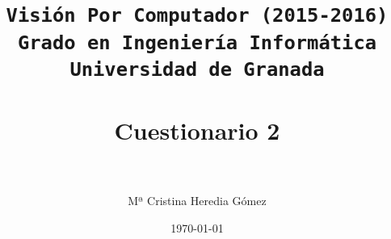 


\title{
\normalfont \normalsize
\texttt{{\bf Visión Por Computador (2015-2016)} \\ Grado en Ingeniería Informática \\ Universidad de Granada} \\ [25pt] %
\horrule{0.5pt} \\[0.4cm] %
\huge{ Cuestionario 2} \\ %
\horrule{2pt} \\[0.5cm] %
}

\author{Mª Cristina Heredia Gómez} %
\date{\normalsize\today} %




\maketitle %

\newpage %

\tableofcontents %

\listoffigures


\newpage



\newpage

